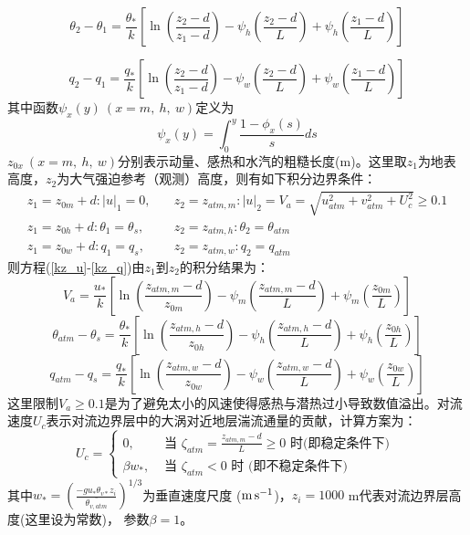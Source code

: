 \begin{equation}
\theta_{2}-\theta_{1}=\frac{\theta_{*}}{k}\left[\ln \left(\frac{z_{2}-d}{z_{1}-d}\right)-\psi_{h}\left(\frac{z_{2}-d}{L}\right)+\psi_{h}\left(\frac{z_{1}-d}{L}\right)\right]
\end{equation}

\begin{equation}
q_{2}-q_{1}=\frac{q_{*}}{k}\left[\ln \left(\frac{z_{2}-d}{z_{1}-d}\right)-\psi_{w}\left(\frac{z_{2}-d}{L}\right)+\psi_{w}\left(\frac{z_{1}-d}{L}\right)\right]
\end{equation}
其中函数$\psi_x\left(y\right)\ (x=m,\ h,\ w)$定义为
\begin{equation}
\psi_{x}(y)=\int_{0}^{y} \frac{1-\phi_{x}(s)}{s} d s
\end{equation}
$z_{0x}\ (x=m,\ h,\ w)$分别表示动量、感热和水汽的粗糙长度(m)。这里取$z_1$为地表高度，$z_2$为大气强迫参考（观测）高度，则有如下积分边界条件：
\begin{equation}\label{VaIni}
\begin{array}{ll}z_{1}=z_{0 m}+d:|u|_{1}=0, \quad & z_{2}=z_{atm, m}: |u|_{2}=V_{a}=\sqrt{u_{atm}^{2}+v_{atm}^{2}+U_{c}^{2}} \geq 0.1 \\ 
     z_{1}=z_{0 h}+d: \theta_{1}=\theta_{s}, & z_{2}=z_{atm, h}: \theta_{2}=\theta_{atm} \\ 
     z_{1}=z_{0 w}+d: q_{1}=q_{s}, & z_{2}=z_{atm, w}: q_{2}=q_{atm}\end{array}
\end{equation}
则方程(\ref{kz_u}-\ref{kz_q})由$z_1$到$z_2$的积分结果为：
\begin{equation}\label{Va}
V_{a}=\frac{u_{*}}{k}\left[\ln \left(\frac{z_{atm, m}-d}{z_{0 m}}\right)-\psi_{m}\left(\frac{z_{atm, m}-d}{L}\right)+\psi_{m}\left(\frac{z_{0 m}}{L}\right)\right]
\end{equation}
\begin{equation}\label{theta_atm-theta_s}
\theta_{atm}-\theta_{s}=\frac{\theta_{*}}{k}\left[\ln \left(\frac{z_{atm, h}-d}{z_{0 h}}\right)-\psi_{h}\left(\frac{z_{atm, h}-d}{L}\right)+\psi_{h}\left(\frac{z_{0 h}}{L}\right)\right]
\end{equation}
\begin{equation}\label{q_atm-qs}
q_{atm}-q_{s}=\frac{q_{*}}{k}\left[\ln \left(\frac{z_{atm, w}-d}{z_{0 w}}\right)-\psi_{w}\left(\frac{z_{atm, w}-d}{L}\right)+\psi_{w}\left(\frac{z_{0 w}}{L}\right)\right]
\end{equation}
这里限制$V_a\geq0.1$是为了避免太小的风速使得感热与潜热过小导致数值溢出。对流速度$U_c$表示对流边界层中的大涡对近地层湍流通量的贡献，计算方案为：
\begin{equation}
U_{c}= \begin{cases}
 0, & \text { 当 } \zeta_{atm}=\frac{z_{atm, m}-d}{L} \geq 0 \text { 时(即稳定条件下) } \\
\beta w_{*}, & \text { 当 } \zeta_{atm}<0 \text { 时 (即不稳定条件下) }
\end{cases}
\end{equation}
其中$w_\ast={(\frac{-gu_\ast\theta_{v\ast}z_i}{\bar{\theta_{v,atm}}})}^{1/3}$为垂直速度尺度 ($\rm m\,s^{-1}$)，$z_i=1000$ m代表对流边界层高度(这里设为常数)，
参数$\beta=1$。

